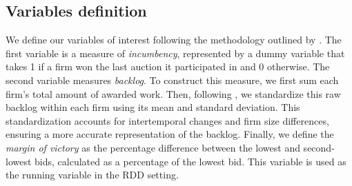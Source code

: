 \documentclass[12 pt]{elsarticle}
\begin{document}
\subsection{Variables definition}
We define our variables of interest following the methodology outlined by \cite{kawai2022study}. The first variable is a measure of \textit{incumbency}, represented by a dummy variable that takes 1 if a firm won the last auction it participated in and 0 otherwise. The second variable measures \textit{backlog}. To construct this measure, we first sum each firm's total amount of awarded work. Then, following \cite{kawai2022study}, we standardize this raw backlog within each firm using its mean and standard deviation. This standardization accounts for intertemporal changes and firm size differences, ensuring a more accurate representation of the backlog.
Finally, we define the \textit{margin of victory} as the percentage difference between the lowest and second-lowest bids, calculated as a percentage of the lowest bid. This variable is used as the running variable in the RDD setting.







\end{document}
